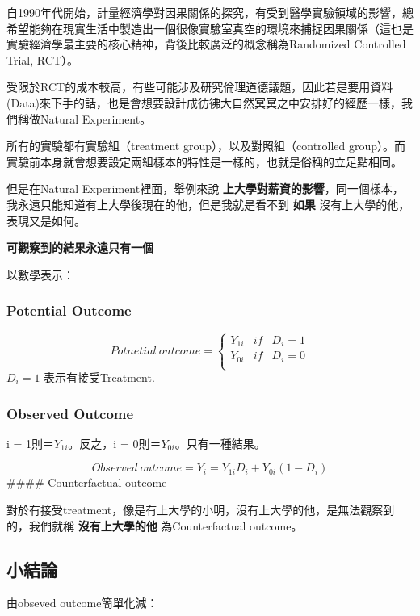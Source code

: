 \documentclass[]{book}
\begin{document}
自1990年代開始，計量經濟學對因果關係的探究，有受到醫學實驗領域的影響，總希望能夠在現實生活中製造出一個很像實驗室真空的環境來捕捉因果關係（這也是實驗經濟學最主要的核心精神，背後比較廣泛的概念稱為Randomized Controlled Trial, RCT）。

受限於RCT的成本較高，有些可能涉及研究倫理道德議題，因此若是要用資料(Data)來下手的話，也是會想要設計成彷彿大自然冥冥之中安排好的經歷一樣，我們稱做Natural Experiment。

所有的實驗都有實驗組（treatment group），以及對照組（controlled group）。而實驗前本身就會想要設定兩組樣本的特性是一樣的，也就是俗稱的立足點相同。

但是在Natural Experiment裡面，舉例來說 \textbf{上大學對薪資的影響}，同一個樣本，我永遠只能知道有上大學後現在的他，但是我就是看不到 \textbf{如果} 沒有上大學的他，表現又是如何。

\textbf{可觀察到的結果永遠只有一個}

以數學表示：

\hypertarget{potential-outcome}{%
\subsubsection{Potential Outcome}\label{potential-outcome}}

\[
Potnetial\ outcome =
\begin{cases}
Y_{1i} & if & D_i=1\\
Y_{0i} & if & D_i=0\\
\end{cases}
\]
\(D_i = 1\) 表示有接受Treatment.

\hypertarget{observed-outcome}{%
\subsubsection{Observed Outcome}\label{observed-outcome}}

i = 1則＝\(Y_{1i}\)。反之，i = 0則＝\(Y_{0i}\)。只有一種結果。

\[
Observed\ outcome =
Y_i = Y_{1i}D_i + Y_{0i}(1-D_i)
\]
\#\#\#\# Counterfactual outcome

對於有接受treatment，像是有上大學的小明，沒有上大學的他，是無法觀察到的，我們就稱 \textbf{沒有上大學的他} 為Counterfactual outcome。

\subsection{小結論}

由obseved outcome簡單化減：
\end{document}
